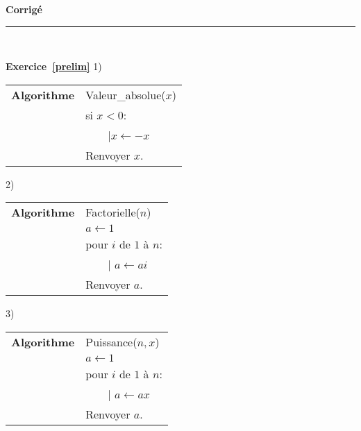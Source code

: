 \documentclass[10pt,a4paper]{article}
\title{}
\date{}
\newcommand{\HRule}{\rule{\linewidth}{0.5mm}}
\begin{document}
\pagestyle{fancy}

\fancyhead{}
 \fancyfoot{}


\newcommand{\lb}{\llbracket}
\newcommand{\rb}{\rrbracket}
\newcommand{\N}{\mathbb{N}}
\newcommand{\R}{\mathbb{R}}
\newcommand{\Z}{\mathbb{Z}}




\newcommand{\md}[3]{#1\ \equiv \ #2 \! \! \! \! \! \pmod {#3} }
\newcommand{\nmd}[3]{#1 \not \equiv #2 \! \! \! \! \!  \pmod {#3} }
\newcommand{\mda}[3]{#1 \equiv #2 \! \!  \pmod {#3} }
\newcommand{\nmda}[3]{#1 \not \equiv #2 \! \! \pmod {#3} }
\newcommand{\mo}[2]{#1 \! \! \! \! \! \pmod #2 }
\newcommand{\moa}[2]{#1 \! \!  \pmod {#2} }

\thispagestyle{fancy}

\begin{center}
    { \huge \bfseries
Corrigé
     \\ [0cm] }
    \HRule \\[0.5cm]
\end{center}






\textbf{Exercice~\ref{prelim}}   1)

\begin{tabular}{ll}
\textbf{Algorithme} &Valeur\_absolue($x$) \\
& si $x<0$:\\
&\ \ \ {\ \rm |}$x\leftarrow -x$\\
& Renvoyer $x$.
\end{tabular}

2)

\begin{tabular}{ll}
\textbf{Algorithme} &Factorielle($n$) \\
&$a\leftarrow 1$\\
&  pour $i$ de $1$ à $n$:\\
&\ \ \ {\ \rm |} $a\leftarrow ai$\\
& Renvoyer $a$.
\end{tabular}


3)

\begin{tabular}{ll}
\textbf{Algorithme} &Puissance($n,x$) \\
&$a\leftarrow 1$\\
&  pour $i$ de $1$ à $n$:\\
&\ \ \ {\ \rm |} $a\leftarrow ax$\\
& Renvoyer $a$.
\end{tabular}
\end{document}
